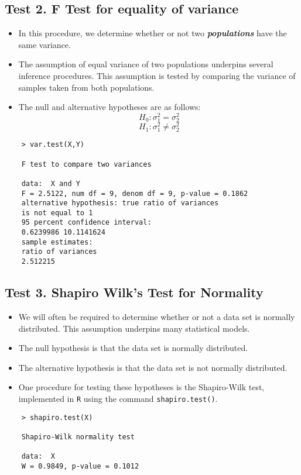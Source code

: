 
\subsection*{Test 2. F Test for equality of variance}
\begin{itemize}
	\item In this procedure, we determine whether or not two \textit{\textbf{populations}} have the same variance.
	\item The assumption of equal variance of two populations underpins several inference procedures. This assumption is tested by comparing the variance of samples taken from both populations.
	\item The null and alternative hypotheses are as follows:
	\[ H_0: \sigma^2_1 = \sigma^2_2 \]
	\[ H_1: \sigma^2_1 \neq \sigma^2_2 \]
\end{itemize}
\begin{framed}
	\begin{verbatim}
	> var.test(X,Y)
	
	F test to compare two variances
	
	data:  X and Y
	F = 2.5122, num df = 9, denom df = 9, p-value = 0.1862
	alternative hypothesis: true ratio of variances
	is not equal to 1
	95 percent confidence interval:
	0.6239986 10.1141624
	sample estimates:
	ratio of variances 
	2.512215 
	\end{verbatim}
\end{framed}

\subsection*{Test 3. Shapiro Wilk's Test for Normality}
\begin{itemize}
	\item We will often be required to determine whether or not a data set is normally distributed.
	This assumption underpins many statistical models.
	\item The null hypothesis is that the data set is normally distributed.
	\item The alternative hypothesis is that the data set is not normally distributed.
	\item One procedure for testing these hypotheses is the Shapiro-Wilk test, implemented in \texttt{R} using the command \texttt{shapiro.test()}.
\end{itemize}
\begin{framed}
	\begin{verbatim}
	> shapiro.test(X)
	
	Shapiro-Wilk normality test
	
	data:  X
	W = 0.9849, p-value = 0.1012
	
	
	\end{verbatim}
\end{framed}

	